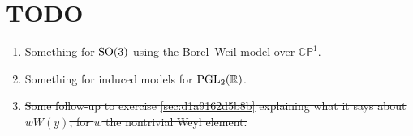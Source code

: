 \documentclass[reqno]{amsart} 
\numberwithin{equation}{section}
\begin{document}
\section{TODO}

\begin{enumerate}
\item Something for $\operatorname{SO}(3)$ using the Borel--Weil model over $\mathbb{C} \mathbb{P}^1$. 
\item Something for induced models for $\operatorname{PGL}_2(\mathbb{R})$.
\item \sout{Some follow-up to exercise \ref{sec:d1a9162d5b8b} explaining what it says about $w W(y)$, for $w$ the nontrivial Weyl element.}
\end{enumerate}



{} 
\end{document}
